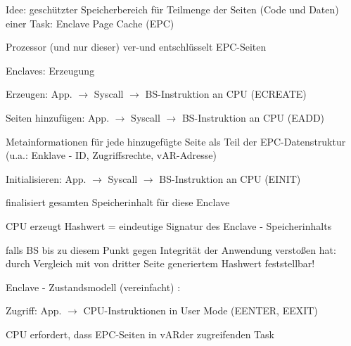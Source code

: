 \documentclass[a4paper]{article}
\begin{document}
\begin{multicols}{3}
    \begin{itemize*}
        \item
        Idee: geschützter Speicherbereich für Teilmenge der Seiten (Code und
        Daten) einer Task: Enclave Page Cache (EPC)
        \item
        Prozessor (und nur dieser) ver-und entschlüsselt EPC-Seiten
        \item
        \item
        Enclaves: Erzeugung
        \begin{itemize*}
            \item Erzeugen: App. $\rightarrow$ Syscall $\rightarrow$ BS-Instruktion an CPU (ECREATE)
            \item Seiten hinzufügen: App. $\rightarrow$ Syscall $\rightarrow$ BS-Instruktion an CPU (EADD) \begin{itemize*} \item Metainformationen für jede hinzugefügte Seite als Teil der EPC-Datenstruktur (u.a.: Enklave - ID, Zugriffsrechte, vAR-Adresse) \end{itemize*}
            \item Initialisieren: App. $\rightarrow$ Syscall $\rightarrow$ BS-Instruktion an CPU (EINIT) \begin{itemize*} \item finalisiert gesamten Speicherinhalt für diese Enclave \item CPU erzeugt Hashwert = eindeutige Signatur des Enclave - Speicherinhalts \item falls BS bis zu diesem Punkt gegen Integrität der Anwendung verstoßen hat: durch Vergleich mit von dritter Seite generiertem Hashwert feststellbar! \end{itemize*}
        \end{itemize*}
        \item
        Enclave - Zustandsmodell (vereinfacht) :
        \item
        Zugriff: App. $\rightarrow$ CPU-Instruktionen in User
        Mode (EENTER, EEXIT)
        \begin{itemize*}
            \item CPU erfordert, dass EPC-Seiten in vARder zugreifenden Task
        \end{itemize*}
    \end{itemize*}



\end{multicols}
\end{document}
